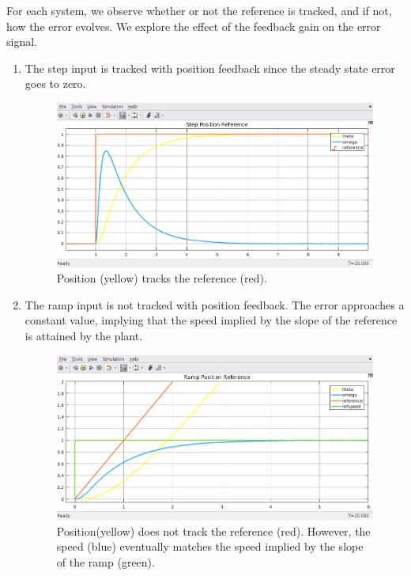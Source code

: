 \documentclass[11pt,a4paper]{article}
\begin{document}
For each system, we observe whether or not the reference is tracked, and if not, how the error evolves. We explore the effect of the feedback gain on the error signal.
\begin{enumerate}
	\item The step input is tracked with position feedback since the steady state error goes to zero.
	
	\begin{figure}[h!]
	\includegraphics[width=\textwidth]{imglab/lab4sol_steppostraj.png}
	\caption{Position (yellow) tracks the reference (red).}
	\end{figure}
	
	\item The ramp input is not tracked with position feedback. The error approaches a constant value, implying that the speed implied by the slope of the reference is attained by the plant.

	\begin{figure}[h!]
	\includegraphics[width=\textwidth]{imglab/lab4sol_ramppostraj.png}
	\caption{Position(yellow) does not track the reference (red). However, the speed (blue) eventually matches the speed implied by the slope of the ramp (green). }
	\end{figure}	
	

\end{enumerate}
\end{document}

